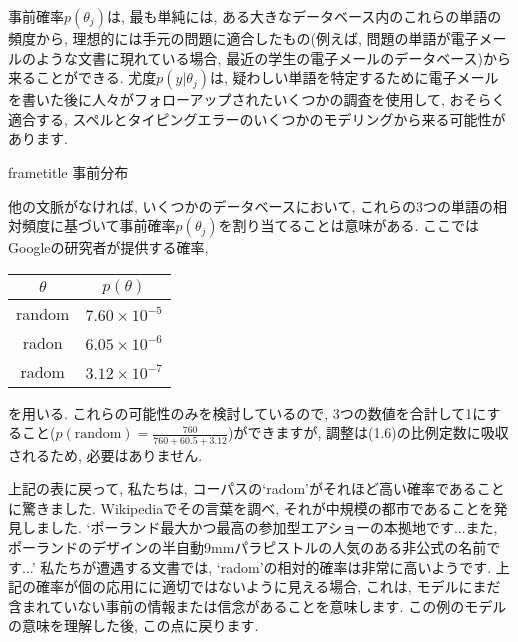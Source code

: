 \documentclass[10pt,dvipdfmx,a4]{beamer}
\newcommand{\dbox}[1]{\begin{beamercolorbox}[wd=122mm, sep=0pt, shadow=false, rounded=false]{frametitle} { #1}\end{beamercolorbox}}
\begin{document}

\begin{frame}
事前確率$p(\theta_j)$は, 最も単純には, ある大きなデータベース内のこれらの単語の頻度から, 理想的には手元の問題に適合したもの(例えば, 問題の単語が電子メールのような文書に現れている場合, 最近の学生の電子メールのデータベース)から来ることができる.
尤度$p(y|\theta_j)$は, 疑わしい単語を特定するために電子メールを書いた後に人々がフォローアップされたいくつかの調査を使用して, おそらく適合する, スペルとタイピングエラーのいくつかのモデリングから来る可能性があります.
\end{frame}


\begin{frame}
\dbox{事前分布}
他の文脈がなければ, いくつかのデータベースにおいて, これらの3つの単語の相対頻度に基づいて事前確率$p(\theta_j)$を割り当てることは意味がある.
ここではGoogleの研究者が提供する確率,
\begin{table}[htb]
  \begin{tabular}{cc}
    $\theta$ & $p(\theta)$\\ \hline
    random & $7.60 \times 10^{-5}$  \\
    radon   & $6.05\times 10^{-6}$ \\
    radom   & $3.12\times10^{-7}$  \\
  \end{tabular}
\end{table}
を用いる.
これらの可能性のみを検討しているので, 3つの数値を合計して1にすること($p(\text{random})=\tfrac{760}{760+60.5+3.12}$)ができますが, 調整は(1.6)の比例定数に吸収されるため, 必要はありません.
\end{frame}


\begin{frame}
上記の表に戻って, 私たちは, コーパスの`radom'がそれほど高い確率であることに驚きました.
Wikipediaでその言葉を調べ, それが中規模の都市であることを発見しました.
`ポーランド最大かつ最高の参加型エアショーの本拠地です...また, ポーランドのデザインの半自動9mmパラピストルの人気のある非公式の名前です...'
私たちが遭遇する文書では, `radom'の相対的確率は非常に高いようです.
上記の確率が個の応用にに適切ではないように見える場合, これは, モデルにまだ含まれていない事前の情報または信念があることを意味します.
この例のモデルの意味を理解した後, この点に戻ります.
\end{frame}
\end{document}
